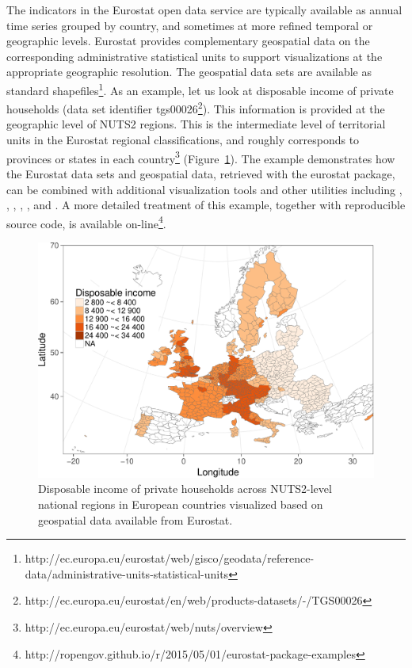 The indicators in the Eurostat open data service are typically
available as annual time series grouped by country, and sometimes at
more refined temporal or geographic levels. Eurostat provides
complementary geospatial data on the corresponding administrative
statistical units to support visualizations at the appropriate
geographic resolution. The geospatial data sets are available as
standard
shapefiles\footnote{http://ec.europa.eu/eurostat/web/gisco/geodata/reference-data/administrative-units-statistical-units}. As
an example, let us look at disposable income of private households
(data set identifier
tgs00026\footnote{http://ec.europa.eu/eurostat/en/web/products-datasets/-/TGS00026}). This
information is provided at the geographic level of NUTS2 regions. This
is the intermediate level of territorial units in the Eurostat
regional classifications, and roughly corresponds to provinces or
states in each
country\footnote{http://ec.europa.eu/eurostat/web/nuts/overview}
(Figure~\ref{fig:mapexample}). The
example demonstrates how the Eurostat data sets and geospatial data,
retrieved with the eurostat package, can be combined with additional
visualization tools and other utilities including
 \citep{grid},  \citep{maptools},  \citep{rgdal},
 \citep{rgeos},  \citep{scales}, and
 \citep{stringr}. A more detailed treatment of this
example, together with reproducible source code, is available
on-line\footnote{http://ropengov.github.io/r/2015/05/01/eurostat-package-examples}.


\begin{figure}
\begin{center}
\includegraphics{2015-manu-mapexample-1}
\caption{Disposable income of private households across NUTS2-level national regions in European countries visualized based on geospatial data available from Eurostat.}
\label{fig:mapexample}
\end{center}
\end{figure}


